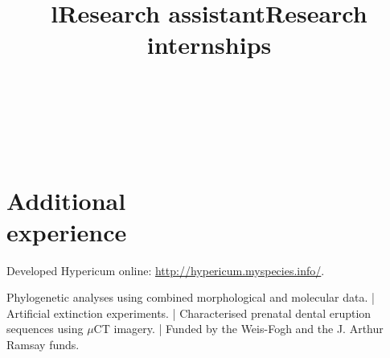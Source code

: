 \documentclass[margin]{res}
\begin{document}
\begin{resume}

	\begin{format}
		\title{l}\\
		\\
		\body\\
	\end{format}

	\section{Additional\\experience}
	\title{\textbf{Research assistant}}
	\begin{position}
		Developed Hypericum online: \url{http://hypericum.myspecies.info/}.
	\end{position}
	\title{\textbf{Research internships}}
	\begin{position}
		Phylogenetic analyses using combined morphological and molecular data.
		|
		Artificial extinction experiments.
		|
		Characterised prenatal dental eruption sequences using $\mu$CT imagery.
		|
		Funded by the Weis-Fogh and the J. Arthur Ramsay funds.
	\end{position}

\end{resume}
\end{document}
